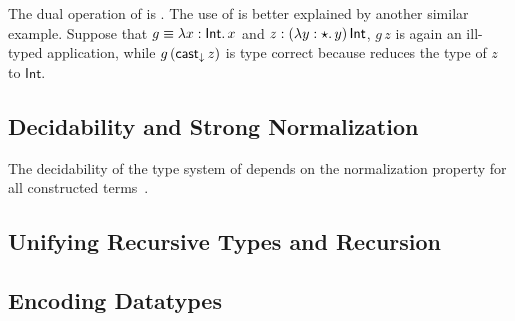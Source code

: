 The dual operation of \castup is \castdn. The use of \castdn is better explained by another similar example. Suppose that $ g \equiv \lambda x:\mathsf{Int}.\,x $ and $ z : (\lambda y:\star.\,y)\,\mathsf{Int} $, $ g\,z $ is again an ill-typed application, while $ g\,(\mathsf{cast}_\downarrow\,z) $ is type correct because \castdn reduces the type of $ z $ to $ \mathsf{Int} $.

\subsection{Decidability and Strong Normalization}


The decidability of the type system of \coc depends on the normalization property for all constructed terms~\cite{coc:decidability}.

\subsection{Unifying Recursive Types and Recursion}


\subsection{Encoding Datatypes}

